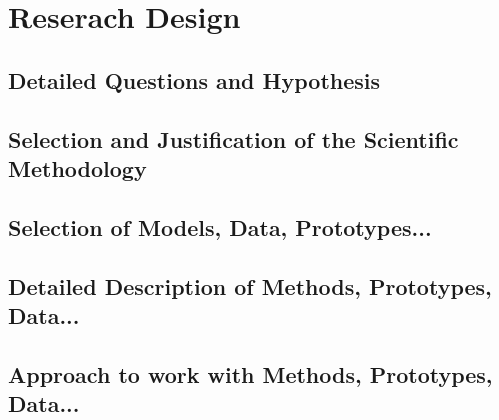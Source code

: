 
\chapter{Reserach Design}

\section{Detailed Questions and Hypothesis}

\section{Selection and Justification of the Scientific Methodology}

\section{Selection of Models, Data, Prototypes...}

\section{Detailed Description of Methods, Prototypes, Data...}

\section{Approach to work with Methods, Prototypes, Data...}

